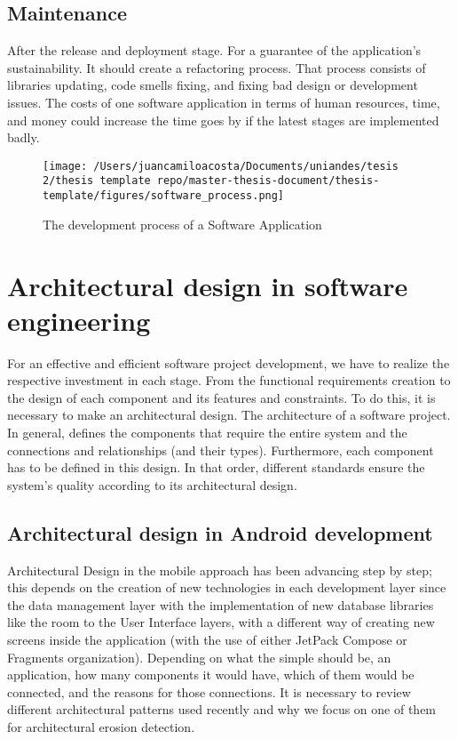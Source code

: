 \subsection{Maintenance}
After the release and deployment stage. For a guarantee of the application's sustainability. It should create a refactoring process. That process consists of libraries updating, code smells fixing, and fixing bad design or development issues. The costs of one software application in terms of human resources, time, and money could increase the time goes by if the latest stages are implemented badly.

\begin{figure}[h]
    	\centering
    		\texttt{[image: /Users/juancamiloacosta/Documents/uniandes/tesis 2/thesis template repo/master-thesis-document/thesis-template/figures/software\_process.png]}
   			 \caption{The development process of a Software Application}
   			 \label{fig:ast}
\end{figure}


\section{Architectural design in software engineering}
For an effective and efficient software project development, we have to realize the respective investment in each stage. From the functional requirements creation to the design of each component and its features and constraints. To do this, it is necessary to make an architectural design. The architecture of a software project. In general, defines the components that require the entire system and the connections and relationships (and their types). Furthermore, each component has to be defined in this design. In that order, different standards ensure the system’s quality according to its architectural design.

\subsection{Architectural design in Android development}
Architectural Design in the mobile approach has been advancing step by step; this depends on the creation of new technologies in each development layer since the data management layer with the implementation of new database libraries like the room to the User Interface layers, with a different way of creating new screens inside the application (with the use of either JetPack Compose or Fragments organization).
Depending on what the simple should be, an application, how many components it would have, which of them would be connected, and the reasons for those connections. It is necessary to review different architectural patterns used recently and why we focus on one of them for architectural erosion detection.

